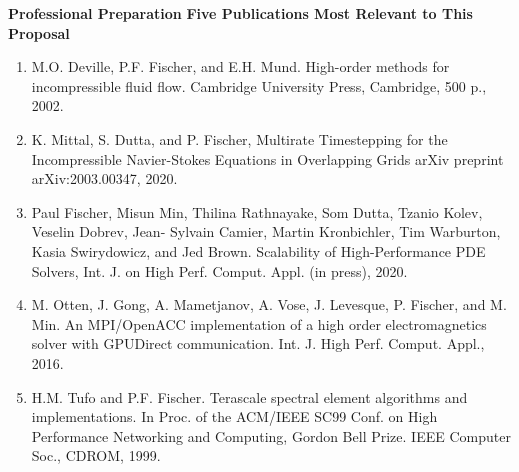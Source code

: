 \documentclass[11pt,letterpaper,english]{article}
\begin{document}
\begin{flushleft} {\bf Professional Preparation}
\vspace{.04in}
{\bf Five Publications Most Relevant to This Proposal}
\vspace{-6pt}
\begin{enumerate} \itemsep1pt \parskip0pt 
 \item M.O. Deville, P.F. Fischer, and E.H. Mund. High-order methods for incompressible fluid flow.
  Cambridge University Press, Cambridge, 500 p., 2002. \\
 \item K. Mittal, S. Dutta, and P. Fischer, Multirate Timestepping for the Incompressible Navier-Stokes
  Equations in Overlapping Grids arXiv preprint arXiv:2003.00347, 2020. \\
 \item Paul Fischer, Misun Min, Thilina Rathnayake, Som Dutta, Tzanio Kolev, Veselin Dobrev, Jean-
  Sylvain Camier, Martin Kronbichler, Tim Warburton, Kasia Swirydowicz, and Jed Brown. Scalability
  of High-Performance PDE Solvers, Int. J. on High Perf. Comput. Appl. (in press), 2020. \\
 \item M. Otten, J. Gong, A. Mametjanov, A. Vose, J. Levesque, P. Fischer, and M. Min. An MPI/OpenACC
  implementation of a high order electromagnetics solver with GPUDirect communication.
  Int. J. High Perf. Comput. Appl., 2016. \\
 \item H.M. Tufo and P.F. Fischer. Terascale spectral element algorithms and implementations. In Proc.
of the ACM/IEEE SC99 Conf. on High Performance Networking and Computing, Gordon Bell
Prize. IEEE Computer Soc., CDROM, 1999. \\
\end{enumerate}


\end{flushleft}
\end{document}
